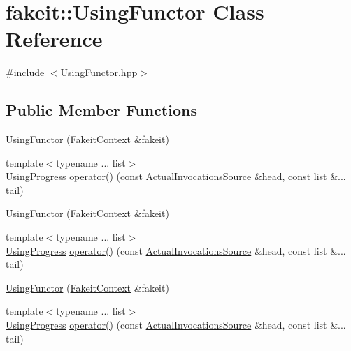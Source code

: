 \hypertarget{classfakeit_1_1UsingFunctor}{}\section{fakeit\+::Using\+Functor Class Reference}
\label{classfakeit_1_1UsingFunctor}


{\ttfamily \#include $<$Using\+Functor.\+hpp$>$}

\subsection*{Public Member Functions}
\begin{DoxyCompactItemize}
\item 
\mbox{\hyperlink{classfakeit_1_1UsingFunctor_ab7ed9b94b7e7c0fe306f12a2f33d1b64}{Using\+Functor}} (\mbox{\hyperlink{structfakeit_1_1FakeitContext}{Fakeit\+Context}} \&fakeit)
\item 
{\footnotesize template$<$typename ... list$>$ }\\\mbox{\hyperlink{classfakeit_1_1UsingProgress}{Using\+Progress}} \mbox{\hyperlink{classfakeit_1_1UsingFunctor_ac93b365a3185f144cd88bb3f38864fb5}{operator()}} (const \mbox{\hyperlink{structfakeit_1_1ActualInvocationsSource}{Actual\+Invocations\+Source}} \&head, const list \&... tail)
\item 
\mbox{\hyperlink{classfakeit_1_1UsingFunctor_ab7ed9b94b7e7c0fe306f12a2f33d1b64}{Using\+Functor}} (\mbox{\hyperlink{structfakeit_1_1FakeitContext}{Fakeit\+Context}} \&fakeit)
\item 
{\footnotesize template$<$typename ... list$>$ }\\\mbox{\hyperlink{classfakeit_1_1UsingProgress}{Using\+Progress}} \mbox{\hyperlink{classfakeit_1_1UsingFunctor_ac93b365a3185f144cd88bb3f38864fb5}{operator()}} (const \mbox{\hyperlink{structfakeit_1_1ActualInvocationsSource}{Actual\+Invocations\+Source}} \&head, const list \&... tail)
\item 
\mbox{\hyperlink{classfakeit_1_1UsingFunctor_ab7ed9b94b7e7c0fe306f12a2f33d1b64}{Using\+Functor}} (\mbox{\hyperlink{structfakeit_1_1FakeitContext}{Fakeit\+Context}} \&fakeit)
\item 
{\footnotesize template$<$typename ... list$>$ }\\\mbox{\hyperlink{classfakeit_1_1UsingProgress}{Using\+Progress}} \mbox{\hyperlink{classfakeit_1_1UsingFunctor_ac93b365a3185f144cd88bb3f38864fb5}{operator()}} (const \mbox{\hyperlink{structfakeit_1_1ActualInvocationsSource}{Actual\+Invocations\+Source}} \&head, const list \&... tail)

\end{DoxyCompactItemize}

